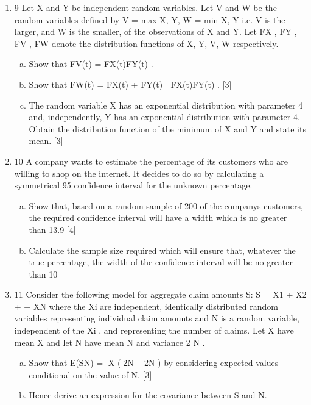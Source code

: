 \documentclass[a4paper,12pt]{article}
\begin{document}
\begin{enumerate}
\item 9 Let X and Y be independent random variables. Let V and W be the random variables
defined by
V = max {X, Y}, W = min {X, Y}
i.e. V is the larger, and W is the smaller, of the observations of X and Y.
Let FX , FY , FV , FW denote the distribution functions of X, Y, V, W respectively.
\begin{enumerate}[(a)]
\item Show that FV(t) = FX(t)FY(t) . 
\item Show that FW(t) = FX(t) + FY(t)  FX(t)FY(t) . [3]
\item The random variable X has an exponential distribution with parameter 4 and,
independently, Y has an exponential distribution with parameter 4. Obtain the
distribution function of the minimum of X and Y and state its mean. [3]
\end{enumerate}

\item 10 A company wants to estimate the percentage of its customers who are willing to shop
on the internet. It decides to do so by calculating a symmetrical 95%
confidence interval for the unknown percentage.
\begin{enumerate}[(a)]
\item Show that, based on a random sample of 200 of the companys customers, the
required confidence interval will have a width which is no greater than 13.9%
[4]
\item Calculate the sample size required which will ensure that, whatever the true
percentage, the width of the confidence interval will be no greater than 10%
\end{enumerate}
\item 11 Consider the following model for aggregate claim amounts S:
S = X1 + X2 + + XN
where the Xi are independent, identically distributed random variables representing
individual claim amounts and N is a random variable, independent of the Xi , and
representing the number of claims. Let X have mean X and let N have mean N and
variance 2
N .
\begin{enumerate}[(a)]
\item Show that
E(SN) = X (2N  2N )
by considering expected values conditional on the value of N. [3]
\item Hence derive an expression for the covariance between S and N. 
\end{enumerate}
\end{enumerate}
\end{document}
